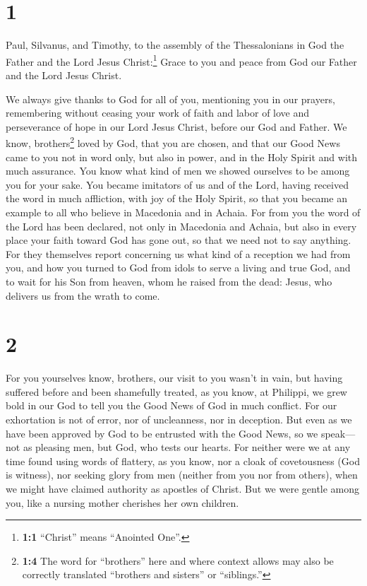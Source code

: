 \hypertarget{section}{%
\section{1}\label{section}}

 Paul, Silvanus, and Timothy, to the assembly of the
Thessalonians in God the Father and the Lord Jesus Christ:\footnote{\textbf{1:1}
  ``Christ'' means ``Anointed One''.} Grace to you and peace from God
our Father and the Lord Jesus Christ.

 We always give thanks to God for all of you, mentioning
you in our prayers,  remembering without ceasing your work
of faith and labor of love and perseverance of hope in our Lord Jesus
Christ, before our God and Father.  We know,
brothers\footnote{\textbf{1:4} The word for ``brothers'' here and where
  context allows may also be correctly translated ``brothers and
  sisters'' or ``siblings.''} loved by God, that you are chosen,
 and that our Good News came to you not in word only, but
also in power, and in the Holy Spirit and with much assurance. You know
what kind of men we showed ourselves to be among you for your sake.
 You became imitators of us and of the Lord, having
received the word in much affliction, with joy of the Holy Spirit,
 so that you became an example to all who believe in
Macedonia and in Achaia.  For from you the word of the
Lord has been declared, not only in Macedonia and Achaia, but also in
every place your faith toward God has gone out, so that we need not to
say anything.  For they themselves report concerning us
what kind of a reception we had from you, and how you turned to God from
idols to serve a living and true God,  and to wait for
his Son from heaven, whom he raised from the dead: Jesus, who delivers
us from the wrath to come.

\hypertarget{section-1}{%
\section{2}\label{section-1}}

 For you yourselves know, brothers, our visit to you
wasn't in vain,  but having suffered before and been
shamefully treated, as you know, at Philippi, we grew bold in our God to
tell you the Good News of God in much conflict.  For our
exhortation is not of error, nor of uncleanness, nor in deception.
 But even as we have been approved by God to be entrusted
with the Good News, so we speak---not as pleasing men, but God, who
tests our hearts.  For neither were we at any time found
using words of flattery, as you know, nor a cloak of covetousness (God
is witness),  nor seeking glory from men (neither from you
nor from others), when we might have claimed authority as apostles of
Christ.  But we were gentle among you, like a nursing
mother cherishes her own children.


